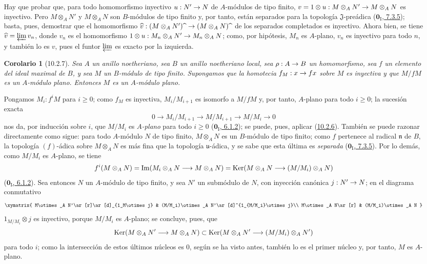 \documentclass[10pt,oneside,openany]{book}
\theoremstyle{egaenv}\newtheorem*{env}{---}
\theoremstyle{egastatement}
\newtheorem*{corollary}{Corolario}
\theoremstyle{egadescription}
\newcommand{\oldpage}[2][]{\marginnote{\normalfont\scriptsize\textbf{#1}\,|\,#2}\ignorespaces}
\renewcommand{\geq}{\geqslant}
\renewcommand{\to}{\mathchoice{\longrightarrow}{\rightarrow}{\rightarrow}{\rightarrow}}
\begin{document}
Hay que probar que, para todo homomorfismo inyectivo $u:N'\to N$ de $A$-módulos de tipo finito, $v=1\otimes u:M\otimes_A N'\to M\otimes_A N$ es inyectivo.
Pero $M\otimes_A N'$ y $M\otimes_A N$ son $B$-módulos de tipo finito y, por tanto, están separados para la topología $\mathfrak{J}$-preádica (\hyperref[0.7.3.5-fr]{$\mathbf{0}_{\mathrm I}$, 7.3.5}); basta, pues, demostrar que el homomorfismo $\widehat v:(M\otimes_A N'){\,\widehat{\,}\,}\to(M\otimes_A N){\,\widehat{\,}\,}$ de los separados completados es inyectivo. Ahora bien, se tiene $\widehat v=\varprojlim v_n$, donde $v_n$ es el homomorfismo $1\otimes u:M_n\otimes_A N'\to M_n\otimes_A N$;
como, por hipótesis, $M_n$ es $A$-plano, $v_n$ es inyectivo para todo $n$, y también lo es $v$, pues el funtor $\varprojlim$ es exacto por la izquierda.


\begin{corollary}[10.2.7]
\label{0.10.2.7}
\label{0.10.2.7-fr}
Sea $A$ un anillo noetheriano, sea $B$ un anillo noetheriano local, sea $\rho:A\to B$ un homomorfismo, sea $f$ un elemento del ideal maximal de $B$, y sea $M$ un $B$-módulo de tipo finito.
Supongamos que la homotecia $f_M:x\to fx$ sobre $M$ es inyectiva y que $M/fM$ es un $A$-módulo plano.
Entonces $M$ es un $A$-módulo plano.
\end{corollary}

Pongamos $M_i:f^iM$ para $i\geq0$;
como $f_M$ es inyectiva, $M_i/M_{i+1}$ es isomorfo a $M/fM$ y, por tanto, $A$-plano para todo $i\geq0$;
la sucesión exacta
\[
  0\longrightarrow M_i/M_{i+1}\longrightarrow M/M_{i+1}
  \longrightarrow M/M_i\longrightarrow0
\]
nos da, por inducción sobre $i$, que $M/M_i$ es \emph{$A$-plano} para todo $i\geq0$ (\hyperref[0.6.1.2-fr]{$\mathbf{0}_{\mathrm I}$, 6.1.2}); se puede, pues, aplicar (\hyperref[0.10.2.6-fr]{10.2.6}). También se puede razonar directamente como sigue: para todo $A$-módulo $N$ de tipo finito, $M\otimes_A N$ es un $B$-módulo de tipo finito;
como $f$ pertenece al radical $\mathfrak n$ de $B$, la topología $(f)$-ádica sobre $M\otimes_A N$ es más fina que la
\oldpage[0\textsubscript{III}]{20}
topología $\mathfrak u$-ádica, y se sabe que esta última es \emph{separada}
(\hyperref[0.7.3.5-fr]{$\mathbf{0}_{\mathrm I}$, 7.3.5}). Por lo demás, como $M/M_i$ es $A$-plano, se tiene
\[
  f^i(M\otimes_A N)=\operatorname{Im}(M_i\otimes_A N\to M\otimes_A N)
  =\operatorname{Ker}(M\otimes_A N\to(M/M_i)\otimes_A N)
\]
(\hyperref[0.6.1.2-fr]{$\mathbf{0}_{\mathrm I}$, 6.1.2}). Sea entonces $N$ un $A$-módulo de tipo finito, y sea $N'$ un submódulo de $N$, con inyección canónica $j:N'\to N$; en el diagrama conmutativo
\[
\xymatrix{
  M\otimes_A N'\ar[r]\ar[d]_{1_M\otimes j} &
  (M/M_i)\otimes_A N'\ar[d]^{1_{M/M_i}\otimes j}\\
  M\otimes_A N\ar[r] & (M/M_i)\otimes_A N
}
\]
$1_{M/M_i}\otimes j$ es inyectivo, porque $M/M_i$ es $A$-plano; se concluye, pues, que
\[
  \operatorname{Ker}(M\otimes_A N'\to M\otimes_A N)
  \subset\operatorname{Ker}(M\otimes_A N'\to(M/M_i)\otimes_A N')
\]
para todo $i$; como la intersección de estos últimos núcleos es $0$, según se ha visto antes, también lo es el primer núcleo y, por tanto, $M$ es $A$-plano.
\end{document}
